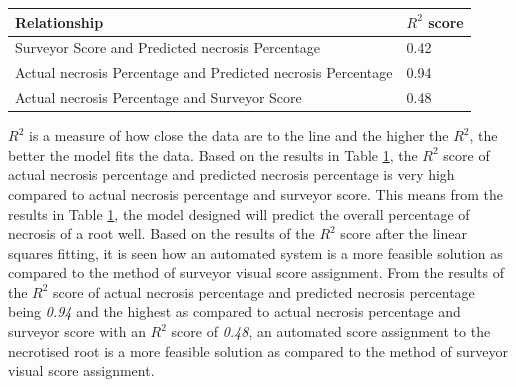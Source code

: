 \documentclass[conference]{IEEEtran}
\begin{document}
{{\begin{table}[t!]
    \begin{tabular}{|l|l|}
    \hline
      Relationship & $R^{2}$ score  \\    \hline
      Surveyor Score and Predicted necrosis Percentage & 0.42  \\\hline
      Actual necrosis Percentage and Predicted necrosis Percentage & 0.94  \\\hline
      Actual necrosis Percentage and Surveyor Score & 0.48  \\ \hline
    \end{tabular}


    \label{tbl:fitting}
\end{table}}

$R^{2}$ is a measure of how close the data are to the line and the higher the $R^{2}$, the better the model fits the data. Based on the results in Table \ref{tbl:fitting}, the $R^{2}$ score of actual necrosis percentage and predicted necrosis percentage is very high compared to actual necrosis percentage and surveyor score. This means from the results in Table \ref{tbl:fitting}, the model designed will predict the overall percentage of necrosis of a root well. Based on the results of the $R^{2}$ score after the linear squares fitting, it is seen how an automated system is a more feasible solution as compared to the method of surveyor visual score assignment. From the results of the $R^{2}$ score of actual necrosis percentage and predicted necrosis percentage being \emph{0.94} and the highest as compared to actual necrosis percentage and surveyor score with an $R^{2}$ score of \emph{0.48},  an automated score assignment to the necrotised root is a more feasible solution as compared to the method of surveyor visual score assignment.







%
%

}
\end{document}
